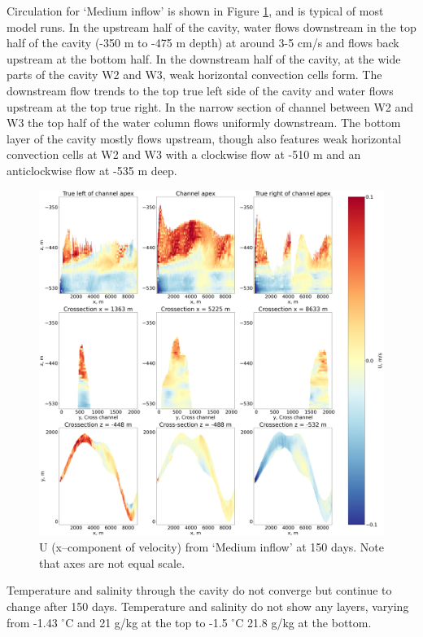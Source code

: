 Circulation for `Medium inflow' is shown in Figure \ref{fig:medium_flow_circulation}, and is typical of most model runs.
In the upstream half of the cavity, water flows downstream in the top half of the cavity (-350 m to -475 m depth) at around 3-5 cm/s and flows back upstream at the bottom half. In the downstream half of the cavity, at the wide parts of the cavity W2 and W3, weak horizontal convection cells form. The downstream flow trends to the top true left side of the cavity and water flows upstream at the top true right. In the narrow section of channel between W2 and W3 the top half of the water column flows uniformly downstream. 
The bottom layer of the cavity mostly flows upstream, though also features weak horizontal convection cells at W2 and W3 with a clockwise flow at -510 m and an anticlockwise flow at -535 m deep. 

\begin{figure}[!ht]
\centering
\includegraphics[width=1\textwidth]{chapters/4/medium_flow_circulation.png}
\caption[Medium inflow (U)]{U (x--component of velocity) from `Medium inflow' at 150 days. Note that axes are not equal scale.}
\label{fig:medium_flow_circulation}
\end{figure}


Temperature and salinity through the cavity do not converge but continue to change after 150 days. Temperature and salinity do not show any layers, varying from -1.43 $^{\circ}$C and 21  g/kg at the top to -1.5 $^{\circ}$C 21.8  g/kg at the bottom. 

